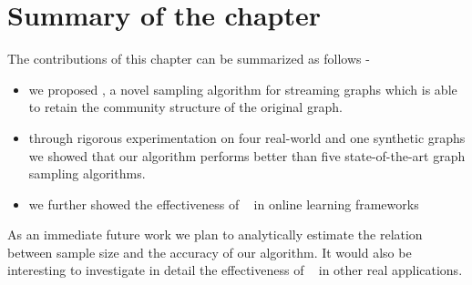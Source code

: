 

\section{Summary of the chapter}
The contributions of this chapter can be summarized as follows - 
\begin{itemize}
 \item we proposed \compas, a novel sampling algorithm for streaming graphs 
which is able to retain the community structure of the original graph.
 \item through rigorous experimentation on four real-world and one synthetic graphs we showed that our algorithm performs better than 
five state-of-the-art graph sampling algorithms.
 \item we further showed the effectiveness of \compas~ in online learning frameworks
\end{itemize}
  
As an immediate future work we plan to analytically estimate the relation between sample size and the accuracy of our algorithm. 
It would also be interesting to investigate in detail the effectiveness of \compas~ in other real applications. 

